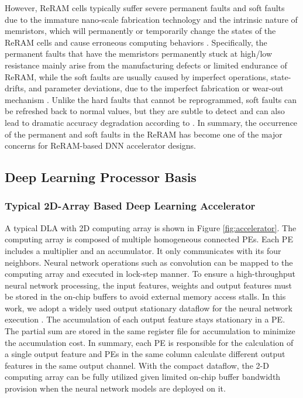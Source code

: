 However, ReRAM cells typically suffer severe permanent faults and soft faults due to the immature nano-scale fabrication technology and the intrinsic nature of memristors, which will permanently or temporarily change the states of the ReRAM cells and cause erroneous computing behaviors \cite{7987496}. Specifically, the permanent faults that have the memristors permanently stuck at high/low resistance mainly arise from the manufacturing defects or limited endurance of ReRAM, while the soft faults are usually caused by imperfect operations, state-drifts, and parameter deviations, due to the imperfect fabrication or wear-out mechanism \cite{7879109}. Unlike the hard faults that cannot be reprogrammed, soft faults can be refreshed back to normal values, but they are subtle to detect and can also lead to dramatic accuracy degradation according to \cite{7987496}. In summary, the occurrence of the permanent and soft faults in the ReRAM has become one of the major concerns for ReRAM-based DNN accelerator designs.



\subsection{Deep Learning Processor Basis}
\subsubsection{Typical 2D-Array Based Deep Learning Accelerator}
A typical DLA with 2D computing array is shown in Figure \ref{fig:accelerator}. The computing array is composed of multiple homogeneous connected PEs. Each PE includes a multiplier and an accumulator. It only communicates with its four neighbors. Neural network operations such as convolution can be mapped to the computing array and executed in lock-step manner. To ensure a high-throughput neural network processing, the input features, weights and output features must be stored in the on-chip buffers to avoid external memory access stalls. In this work, we adopt a widely used output stationary dataflow for the neural network execution \cite{Chen2016Eyeriss}. The accumulation of each output feature stays stationary in a PE. The partial sum are stored in the same register file for accumulation to minimize the accumulation cost. In summary, each PE is responsible for the calculation of a single output feature and PEs in the same column calculate different output features in the same output channel. With the compact dataflow, the 2-D computing array can be fully utilized given limited on-chip buffer bandwidth provision when the neural network models are deployed on it.

